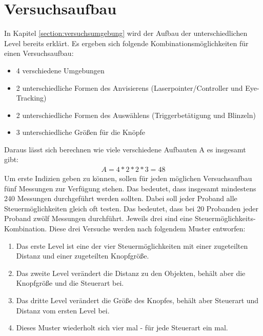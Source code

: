\section{Versuchsaufbau} 
In Kapitel \ref{section:versuchsumgebung} wird der Aufbau der unterschiedlichen Level bereits erklärt. Es ergeben sich folgende Kombinationsmöglichkeiten für einen Versuchsaufbau:
\begin{itemize}
	\item 4 verschiedene Umgebungen
	\item 2 unterschiedliche Formen des Anvisierens (Laserpointer/Controller und Eye-Tracking)
	\item 2 unterschiedliche Formen des Auswählens (Triggerbetätigung und Blinzeln)
	\item 3 unterschiedliche Größen für die Knöpfe
\end{itemize}
Daraus lässt sich berechnen wie viele verschiedene Aufbauten A es insgesamt gibt:
\begin{align}
	A=4*2*2*3=48
\end{align}
Um erste Indizien geben zu können, sollen für jeden möglichen Versuchsaufbau fünf Messungen zur Verfügung stehen. Das bedeutet, dass insgesamt mindestens 240 Messungen durchgeführt werden sollten. Dabei soll jeder Proband alle Steuermöglichkeiten gleich oft testen. Das bedeutet, dass bei 20 Probanden jeder Proband zwölf Messungen durchführt. Jeweils drei sind eine Steuermöglichkeits-Kombination. Diese drei Versuche werden nach folgendem Muster entworfen:
\begin{enumerate}
	\item Das erste Level ist eine der vier Steuermöglichkeiten mit einer zugeteilten Distanz und einer zugeteilten Knopfgröße.
	\item Das zweite Level verändert die Distanz zu den Objekten, behält aber die Knopfgröße und die Steuerart bei.
	\item Das dritte Level verändert die Größe des Knopfes, behält aber Steuerart und Distanz vom ersten Level bei.
	\item Dieses Muster wiederholt sich vier mal - für jede Steuerart ein mal.
\end{enumerate}
